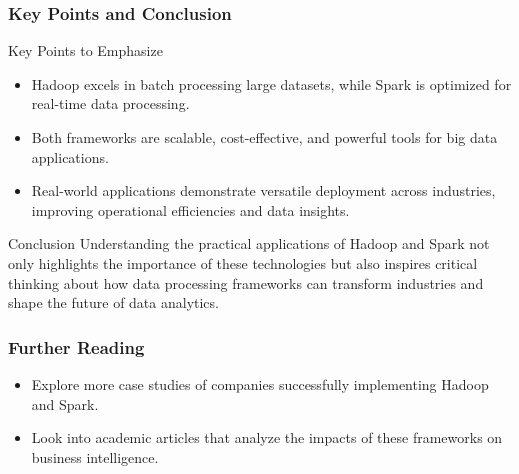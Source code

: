 \documentclass{beamer}
\begin{document}
\begin{frame}[fragile]
    \frametitle{Key Points and Conclusion}
    \begin{block}{Key Points to Emphasize}
        \begin{itemize}
            \item Hadoop excels in batch processing large datasets, while Spark is optimized for real-time data processing.
            \item Both frameworks are scalable, cost-effective, and powerful tools for big data applications.
            \item Real-world applications demonstrate versatile deployment across industries, improving operational efficiencies and data insights.
        \end{itemize}
    \end{block}

    \begin{block}{Conclusion}
        Understanding the practical applications of Hadoop and Spark not only highlights the importance of these technologies but also inspires critical thinking about how data processing frameworks can transform industries and shape the future of data analytics.
    \end{block}
\end{frame}

\begin{frame}[fragile]
    \frametitle{Further Reading}
    \begin{itemize}
        \item Explore more case studies of companies successfully implementing Hadoop and Spark.
        \item Look into academic articles that analyze the impacts of these frameworks on business intelligence.
    \end{itemize}
\end{frame}
\end{document}
